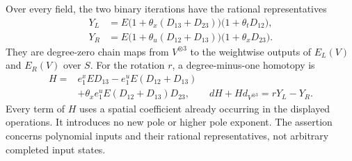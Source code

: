 \begin{theorem}
\label{tr:thm:state-rotation}
Over every field, the two binary iterations have the rational
representatives
\begin{equation}\label{tr:eq:tree-state-operations}
 \begin{aligned}
 Y_L&=E\bigl(1+\theta_x(D_{13}+D_{23})\bigr)
             \bigl(1+\theta_tD_{12}\bigr),\\
 Y_R&=E\bigl(1+\theta_u(D_{12}+D_{13})\bigr)
             \bigl(1+\theta_xD_{23}\bigr).
 \end{aligned}
\end{equation}
They are degree-zero chain maps from \(V^{\otimes3}\) to the
weightwise outputs of \(E_L(V)\) and \(E_R(V)\) over \(S\).
For the rotation \(r\), a degree-minus-one homotopy is
\begin{equation}\label{tr:eq:state-rotation-homotopy}
 \begin{aligned}
 H={}&e_1^x ED_{13}
      -e_1^u E(D_{12}+D_{13})\\
     &+\theta_x e_1^u E(D_{12}+D_{13})D_{23},
 \qquad dH+Hd_{V^{\otimes3}}=rY_L-Y_R.
 \end{aligned}
\end{equation}
Every term of \(H\) uses a spatial coefficient already occurring
in the displayed operations.  It introduces no new pole or higher
pole exponent.  The assertion concerns polynomial inputs and their
rational representatives, not arbitrary completed input states.
\end{theorem}

